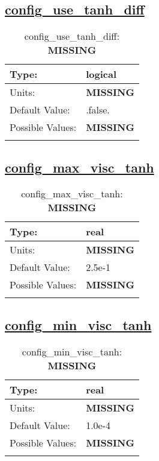 \subsection[config\_use\_tanh\_diff]{\hyperref[sec:nm_tab_vmix_tanh]{config\_use\_tanh\_diff}}
\label{subsec:nm_sec_config_use_tanh_diff}
\begin{center}
\begin{longtable}{| p{2.0in} | p{4.0in} |}
    \hline
    Type: & logical \\
    \hline
    Units: & {\bf \color{red} MISSING} \\
    \hline
    Default Value: & .false. \\
    \hline
    Possible Values: & {\bf \color{red} MISSING} \\
    \hline
    \caption{config\_use\_tanh\_diff: {\bf \color{red} MISSING}}
\end{longtable}
\end{center}
\subsection[config\_max\_visc\_tanh]{\hyperref[sec:nm_tab_vmix_tanh]{config\_max\_visc\_tanh}}
\label{subsec:nm_sec_config_max_visc_tanh}
\begin{center}
\begin{longtable}{| p{2.0in} | p{4.0in} |}
    \hline
    Type: & real \\
    \hline
    Units: & {\bf \color{red} MISSING} \\
    \hline
    Default Value: & 2.5e-1 \\
    \hline
    Possible Values: & {\bf \color{red} MISSING} \\
    \hline
    \caption{config\_max\_visc\_tanh: {\bf \color{red} MISSING}}
\end{longtable}
\end{center}
\subsection[config\_min\_visc\_tanh]{\hyperref[sec:nm_tab_vmix_tanh]{config\_min\_visc\_tanh}}
\label{subsec:nm_sec_config_min_visc_tanh}
\begin{center}
\begin{longtable}{| p{2.0in} | p{4.0in} |}
    \hline
    Type: & real \\
    \hline
    Units: & {\bf \color{red} MISSING} \\
    \hline
    Default Value: & 1.0e-4 \\
    \hline
    Possible Values: & {\bf \color{red} MISSING} \\
    \hline
    \caption{config\_min\_visc\_tanh: {\bf \color{red} MISSING}}
\end{longtable}
\end{center}
